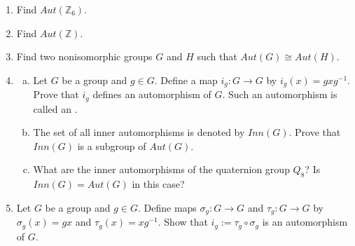 {\begin{enumerate}[(1)]
\item
Find $Aut( {\mathbb Z}_6)$.

\item
Find $Aut( {\mathbb Z})$.
 
\item
Find two nonisomorphic groups $G$ and $H$ such that $Aut(G) \cong Aut(
H)$. 
 
\item
\begin{enumerate}[(a)]
\item
Let $G$ be a group and $g \in G$. Define a map $i_g : G \rightarrow
G$ 
by $i_g(x) = g x g^{-1}$.  Prove that $i_g$ defines an automorphism of
$G$.  Such an automorphism is called an .  
\item
The set of all inner
automorphisms is denoted by $Inn(G)$. Prove that $Inn(G)$ is a subgroup of $Aut(G)$.
\item
What are the inner automorphisms of the quaternion group $Q_8$? Is
$Inn(G) = Aut(G)$ in this case? 
\end{enumerate} 

\item
Let $G$ be a group and $g \in G$.  Define maps $\sigma_g :G
\rightarrow G$ and $\tau_g :G \rightarrow G$
 by $\sigma_g(x) = gx$
and $\tau_g(x) = xg^{-1}$. Show that $i_g := \tau_g \circ \sigma_g$ is
an automorphism of $G$. 
 
 
\end{enumerate}
}





